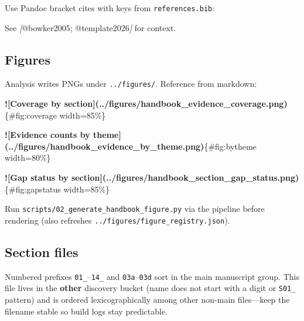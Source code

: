 \documentclass[
]{article}
\newenvironment{Shaded}{}{}
\newcommand{\AlertTok}[1]{\textcolor[rgb]{1.00,0.00,0.00}{\textbf{#1}}}
\newcommand{\CommentTok}[1]{\textcolor[rgb]{0.38,0.63,0.69}{\textit{#1}}}
\newcommand{\NormalTok}[1]{#1}
\newcommand{\OtherTok}[1]{\textcolor[rgb]{0.00,0.44,0.13}{#1}}
\begin{document}
Use Pandoc bracket cites with keys from \texttt{references.bib}:

\begin{Shaded}
\begin{Highlighting}[]
\NormalTok{See }\CommentTok{[}\OtherTok{@bowker2005; @template2026}\CommentTok{]}\NormalTok{ for context.}
\end{Highlighting}
\end{Shaded}

\subsection{Figures}\label{figures}

Analysis writes PNGs under \texttt{../figures/}. Reference from
markdown:

\begin{Shaded}
\begin{Highlighting}[]
\AlertTok{![Coverage by section](../figures/handbook\_evidence\_coverage.png)}\NormalTok{\{\#fig:coverage width=85\%\}}

\AlertTok{![Evidence counts by theme](../figures/handbook\_evidence\_by\_theme.png)}\NormalTok{\{\#fig:bytheme width=80\%\}}

\AlertTok{![Gap status by section](../figures/handbook\_section\_gap\_status.png)}\NormalTok{\{\#fig:gapstatus width=85\%\}}
\end{Highlighting}
\end{Shaded}

Run \texttt{scripts/02\_generate\_handbook\_figure.py} via the pipeline
before rendering (also refreshes
\texttt{../figures/figure\_registry.json}).

\subsection{Section files}\label{section-files}

Numbered prefixes \texttt{01\_}--\texttt{14\_} and
\texttt{03a}--\texttt{03d} sort in the main manuscript group. This file
lives in the \textbf{other} discovery bucket (name does not start with a
digit or \texttt{S01\_} pattern) and is ordered lexicographically among
other non-main files---keep the filename stable so build logs stay
predictable.




\end{document}
